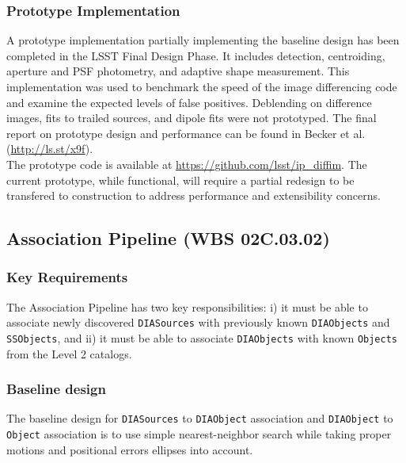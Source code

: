 \documentclass[12pt]{article}
\newcommand{\code}[1]{\texttt{#1}}
\newcommand{\DIASources}{\code{DIASources}\xspace}
\newcommand{\DIAObject}{\code{DIAObject}\xspace}
\newcommand{\DIAObjects}{\code{DIAObjects}\xspace}
\newcommand{\Object}{\code{Object}\xspace}
\newcommand{\Objects}{\code{Objects}\xspace}
\newcommand{\SSObjects}{\code{SSObjects}\xspace}
\newcommand{\wbsAssocP}{WBS 02C.03.02}
\begin{document}
\subsubsection{Prototype Implementation}

A prototype implementation partially implementing the baseline design has been completed in the LSST Final Design Phase. It includes detection, centroiding, aperture and PSF photometry, and adaptive shape measurement.
This implementation was used to benchmark the speed of the image differencing code and examine the expected levels of false positives. Deblending on difference images, fits to trailed sources, and dipole fits were not prototyped. The final report on prototype design and performance can be found in Becker et al. (\url{http://ls.st/x9f}).
\\

The prototype code is available at \url{https://github.com/lsst/ip_diffim}. The current prototype, while functional, will require a partial redesign to be transfered to construction to address performance and extensibility concerns.

\clearpage

\subsection{Association Pipeline (\wbsAssocP)}

\subsubsection{Key Requirements}

The Association Pipeline has two key responsibilities: i) it must be able to associate newly discovered \DIASources with previously known \DIAObjects and \SSObjects, and ii) it must be able to associate \DIAObjects with known \Objects from the Level 2 catalogs.

\subsubsection{Baseline design}

The baseline design for \DIASources to \DIAObject association and \DIAObject to \Object association is to use simple nearest-neighbor search while taking proper motions and positional errors ellipses into account.
\end{document}
